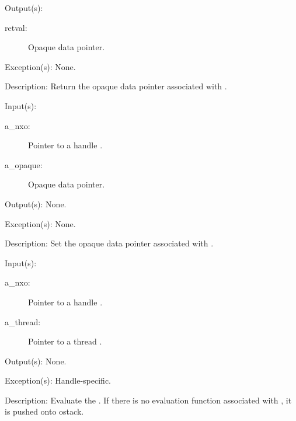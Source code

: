 \begin{capi}
\begin{capilist}
\begin{description}
		\end{description}
	\item[Output(s): ]
		\begin{description}\item[]
		\item[retval: ]
			Opaque data pointer.
		\end{description}
	\item[Exception(s): ] None.
	\item[Description: ]
		Return the opaque data pointer associated with .
	\end{capilist}
\label{nxo_handle_opaque_set}
	\begin{capilist}
	\item[Input(s): ]
		\begin{description}\item[]
		\item[a\_nxo: ]
			Pointer to a handle .
		\item[a\_opaque: ]
			Opaque data pointer.
		\end{description}
	\item[Output(s): ] None.
	\item[Exception(s): ] None.
	\item[Description: ]
		Set the opaque data pointer associated with .
	\end{capilist}
\label{nxo_handle_eval}
	\begin{capilist}
	\item[Input(s): ]
		\begin{description}\item[]
		\item[a\_nxo: ]
			Pointer to a handle \classname{nxo}.
		\item[a\_thread: ]
			Pointer to a thread \classname{nxo}.
		\end{description}
	\item[Output(s): ] None.
	\item[Exception(s): ] Handle-specific.
	\item[Description: ]
		Evaluate the .  If there is no evaluation function
		associated with , it is pushed onto ostack.
	\end{capilist}
\end{capi}
